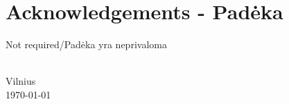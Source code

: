 \chapter*{Acknowledgements - Padėka}
\label{cha:acknowledgements}



Not required/Padėka yra neprivaloma


{\flushright  
    \thesisAuthorName \ \thesisAuthorSurname \\ Vilnius\\ \today\\ 
}
